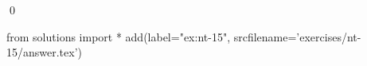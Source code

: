 
\begin{ex} 
  \label{ex:nt-15}
  
  \qed
\end{ex} 
\begin{python0}
from solutions import *
add(label="ex:nt-15",
    srcfilename='exercises/nt-15/answer.tex') 
\end{python0}
